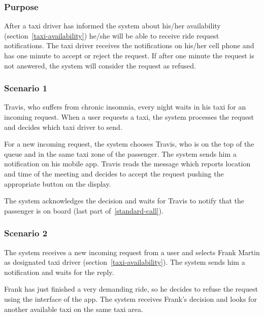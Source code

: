 \label{driver-notification}
\subsubsection{Purpose}

After a taxi driver has informed the system about his/her availability (section~\ref{taxi-availability})
he/she will be able to receive ride request notifications. The taxi driver receives the notifications on his/her cell phone and has one minute to accept or reject the request. If after one minute the request is not answered, the system will consider the request as refused.

\subsubsection{Scenario 1}
Travis, who suffers from chronic insomnia, every night waits in his taxi for an incoming request. When a user requests a taxi, the system processes the request and decides which taxi driver to send.

For a new incoming request, the system chooses Travis, who is on the top of the queue and in the same taxi zone of the passenger. The system sends him a notification on his mobile app. Travis reads the message which reports location and time of the meeting and decides to accept the request pushing the appropriate button on the display.

The system acknowledges the decision and waits for Travis to notify that the passenger is on board (last part of~\ref{standard-call}).

\subsubsection{Scenario 2}
The system receives a new incoming request from a user and selects Frank Martin as designated taxi driver (section~\ref{taxi-availability}).
The system sends him a notification and waits for the reply.

Frank has just finished a very demanding ride, so he decides to refuse the request using the interface of the app. The system receives Frank's decision and looks for another available taxi on the same taxi area.

